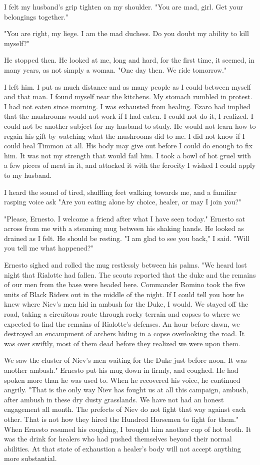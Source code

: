 \documentclass{article}
\begin{document}
I felt my husband's grip tighten on my shoulder. "You are mad, girl. Get your belongings together."

"You are right, my liege. I am the mad duchess. Do you doubt my ability to kill myself?"

He stopped then. He looked at me, long and hard, for the first time, it seemed, in many years, as not simply a woman. "One day then. We ride tomorrow."

I left him. I put as much distance and as many people as I could between myself and that man. I found myself near the kitchens. My stomach rumbled in protest. I had not eaten since morning. I was exhausted from healing. Ezaro had implied that the mushrooms would not work if I had eaten. I could not do it, I realized. I could not be another subject for my husband to study. He would not learn how to regain his gift by watching what the mushrooms did to me. I did not know if I could heal Timmon at all. His body may give out before I could do enough to fix him. It was not my strength that would fail him. I took a bowl of hot gruel with a few pieces of meat in it, and attacked it with the ferocity I wished I could apply to my husband.

I heard the sound of tired, shuffling feet walking towards me, and a familiar rasping voice ask "Are you eating alone by choice, healer, or may I join you?"

"Please, Ernesto. I welcome a friend after what I have seen today." Ernesto sat across from me with a steaming mug between his shaking hands. He looked as drained as I felt. He should be resting. "I am glad to see you back," I said. "Will you tell me what happened?"

Ernesto sighed and rolled the mug restlessly between his palms. "We heard last night that Rialotte had fallen. The scouts reported that the duke and the remains of our men from the base were headed here. Commander Romino took the five units of Black Riders out in the middle of the night. If I could tell you how he knew where Niev's men hid in ambush for the Duke, I would. We stayed off the road, taking a circuitous route through rocky terrain and copses to where we expected to find the remains of Rialotte's defenses. An hour before dawn, we destroyed an encampment of archers hiding in a copse overlooking the road. It was over swiftly, most of them dead before they realized we were upon them.

We saw the cluster of Niev's men waiting for the Duke just before noon. It was another ambush." Ernesto put his mug down in firmly, and coughed. He had spoken more than he was used to. When he recovered his voice, he continued angrily. "That is the only way Niev has fought us at all this campaign, ambush, after ambush in these dry dusty grasslands. We have not had an honest engagement all month. The prefects of Niev do not fight that way against each other. That is not how they hired the Hundred Horsemen to fight for them." When Ernesto resumed his coughing, I brought him another cup of hot broth. It was the drink for healers who had pushed themselves beyond their normal abilities. At that state of exhaustion a healer's body will not accept anything more substantial.
\end{document}
